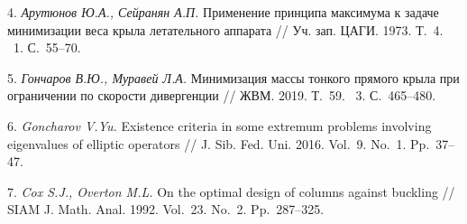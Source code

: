 4. {\it Арутюнов Ю.А., Сейранян А.П.}
Применение принципа максимума к задаче минимизации веса крыла
летательного аппарата
// Уч. зап. ЦАГИ. 1973. Т.~4. \textnumero~1. С.~55\nobreakdash--70.


5. {\it Гончаров В.Ю., Муравей Л.А.}
Минимизация массы тонкого прямого крыла при ограничении по скорости дивергенции
// ЖВМ. 2019. Т.~59. \textnumero~3. С.~465\nobreakdash--480.

6. {\it Goncharov V.Yu.}
Existence criteria in some extremum problems involving eigenvalues of elliptic operators
// J. Sib. Fed. Uni. 2016. Vol.~9. No.~1. Pp.~37\nobreakdash--47.

7. {\it Cox S.J., Overton M.L.}
On the optimal design of columns against buckling
// SIAM J. Math. Anal. 1992. Vol.~23. No.~2. Pp.~287\nobreakdash--325.

